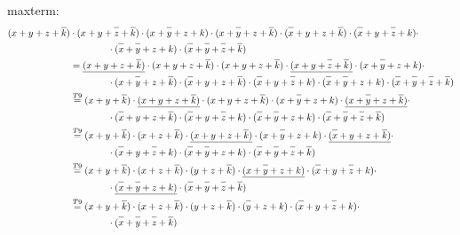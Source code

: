 \documentclass{article}
\begin{document}
\newpage

maxterm:
\begin{align*}
  (x+y+z+\oline{k}) &\cdot (x+y+\oline{z}+\oline{k}) \cdot (x+\oline{y}+z+k) \cdot (x+\oline{y}+z+\oline{k}) \cdot (\oline{x}+y+z+\oline{k}) \cdot (\oline{x}+y+\oline{z}+k) \cdot \\
  &\bigspace \cdot (\oline{x}+\oline{y}+z+k) \cdot (\oline{x}+\oline{y}+\oline{z}+\oline{k})\\
  &= \underline{(x+y+z+\oline{k})} \cdot (x+y+z+\oline{k}) \cdot (x+y+z+\oline{k}) \cdot \underline{(x+y+\oline{z}+\oline{k})} \cdot (x+\oline{y}+z+k) \cdot \\
  &\bigspace \cdot (x+\oline{y}+z+\oline{k}) \cdot (\oline{x}+y+z+\oline{k}) \cdot (\oline{x}+y+\oline{z}+k) \cdot (\oline{x}+\oline{y}+z+k) \cdot (\oline{x}+\oline{y}+\oline{z}+\oline{k})\\
  &\overset{T9}{=} (x+y+\oline{k}) \cdot \underline{(x+y+z+\oline{k})} \cdot (x+y+z+\oline{k}) \cdot (x+\oline{y}+z+k) \cdot \underline{(x+\oline{y}+z+\oline{k})} \cdot \\
  &\bigspace \cdot (\oline{x}+y+z+\oline{k}) \cdot (\oline{x}+y+\oline{z}+k) \cdot (\oline{x}+\oline{y}+z+k) \cdot (\oline{x}+\oline{y}+\oline{z}+\oline{k})\\
  &\overset{T9}{=} (x+y+\oline{k}) \cdot (x+z+\oline{k}) \cdot \underline{(x+y+z+\oline{k})} \cdot (x+\oline{y}+z+k) \cdot \underline{(\oline{x}+y+z+\oline{k})} \cdot\\
  &\bigspace \cdot (\oline{x}+y+\oline{z}+k) \cdot (\oline{x}+\oline{y}+z+k) \cdot (\oline{x}+\oline{y}+\oline{z}+\oline{k})\\
  &\overset{T9}{=} (x+y+\oline{k}) \cdot (x+z+\oline{k}) \cdot (y+z+\oline{k}) \cdot \underline{(x+\oline{y}+z+k)} \cdot (\oline{x}+y+\oline{z}+k) \cdot\\
  &\bigspace \cdot \underline{(\oline{x}+\oline{y}+z+k)} \cdot (\oline{x}+\oline{y}+\oline{z}+\oline{k})\\
  &\overset{T9}{=} (x+y+\oline{k}) \cdot (x+z+\oline{k}) \cdot (y+z+\oline{k}) \cdot (\oline{y}+z+k) \cdot (\oline{x}+y+\oline{z}+k) \cdot\\
  &\bigspace \cdot (\oline{x}+\oline{y}+\oline{z}+\oline{k})
\end{align*}

\newpage

\end{document}
